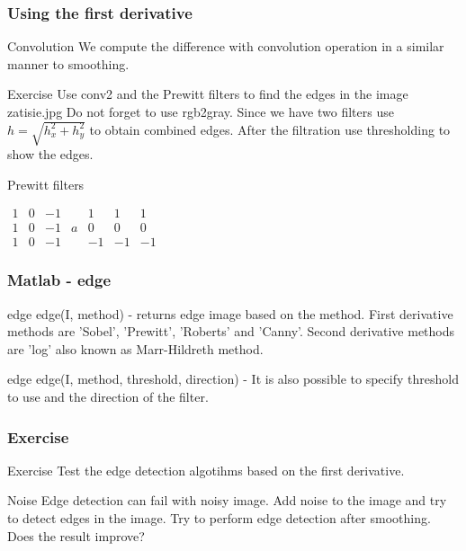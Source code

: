 \documentclass{beamer}
\begin{document}
\begin{frame}
\frametitle{Using the first derivative}
  \begin{block}{Convolution}
  We compute the difference with convolution operation in a similar manner to smoothing.
  \end{block}

  \begin{block}{Exercise}
  Use conv2 and the Prewitt filters to find the edges in the image zatisie.jpg Do not forget to use rgb2gray. Since we have two filters use $h = \sqrt{h_x^2 + h_y^2}$ to obtain combined edges. After the filtration use thresholding to show the edges. 
  \end{block}
 
  \begin{block}{Prewitt filters}
  \begin{center}
  $\begin{matrix}
    1 & 0 & -1 &    & 1 & 1 & 1 \\
    1 & 0 & -1 & a & 0 & 0 & 0 \\
    1 & 0 & -1 &    & -1 & - 1 & -1
  \end{matrix}$
  \end{center}
  \end{block}
\end{frame}

\begin{frame}
\frametitle{Matlab - edge}
  \begin{block}{edge}
  edge(I, method) - returns edge image based on the method. First derivative methods are 'Sobel', 'Prewitt', 'Roberts' and 'Canny'. Second derivative methods are 'log' also known as Marr-Hildreth method.
  \end{block}
 
  \begin{block}{edge}
  edge(I, method, threshold, direction) - It is also possible to specify threshold to use and the direction of the filter.
  \end{block}
\end{frame}

\begin{frame}
\frametitle{Exercise}
  \begin{block}{Exercise}
  Test the edge detection algotihms based on the first derivative.
  \end{block}
    
  \begin{block}{Noise}
  Edge detection can fail with noisy image. Add noise to the image and try to detect edges in the image. Try to perform edge detection after smoothing. Does the result improve?
  \end{block} 
\end{frame}
\end{document}
